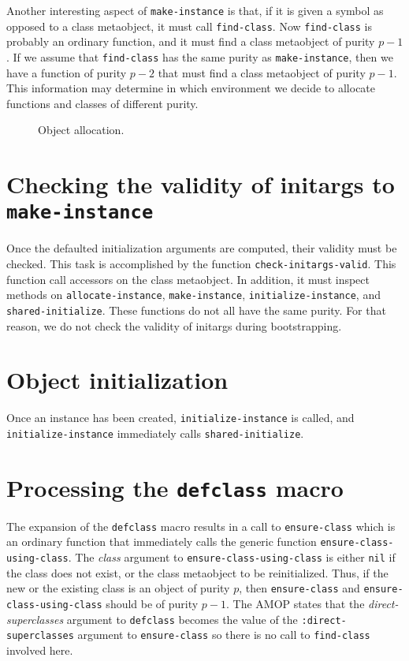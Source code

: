 Another interesting aspect of \texttt{make-instance} is that, if it is
given a symbol as opposed to a class metaobject, it must call
\texttt{find-class}.  Now \texttt{find-class} is probably an ordinary
function, and it must find a class metaobject of purity $p-1$.  If we
assume that \texttt{find-class} has the same purity as
\texttt{make-instance}, then we have a function of purity $p-2$ that
must find a class metaobject of purity $p-1$.  This information may
determine in which environment we decide to allocate functions and
classes of different purity.

\begin{figure}
\begin{center}
\end{center}
\caption{\label{fig-make-instance}
Object allocation.}
\end{figure}

\section{Checking the validity of initargs to \texttt{make-instance}}

Once the defaulted initialization arguments are computed, their
validity must be checked.  This task is accomplished by the function
\texttt{check-initargs-valid}.  This function call accessors on the
class metaobject.  In addition, it must inspect methods on
\texttt{allocate-instance}, \texttt{make-instance},
\texttt{initialize-instance}, and \texttt{shared-initialize}.
These functions do not all have the same purity.  For that reason, we
do not check the validity of initargs during bootstrapping.

\section{Object initialization}

Once an instance has been created, \texttt{initialize-instance} is
called, and \texttt{initialize-instance} immediately calls
\texttt{shared-initialize}.

\section{Processing the \texttt{defclass} macro}

The expansion of the \texttt{defclass} macro results in a call to
\texttt{ensure-class} which is an ordinary function that immediately
calls the generic function \texttt{ensure-class-using-class}.  The
\textit{class} argument to \texttt{ensure-class-using-class} is either
\texttt{nil} if the class does not exist, or the class metaobject to
be reinitialized.  Thus, if the new or the existing class is an object
of purity $p$, then \texttt{ensure-class} and
\texttt{ensure-class-using-class} should be of purity $p-1$.
The AMOP states that the \emph{direct-superclasses} argument to
\texttt{defclass} becomes the value of the
\texttt{:direct-superclasses} argument to \texttt{ensure-class} so
there is no call to \texttt{find-class} involved here.


